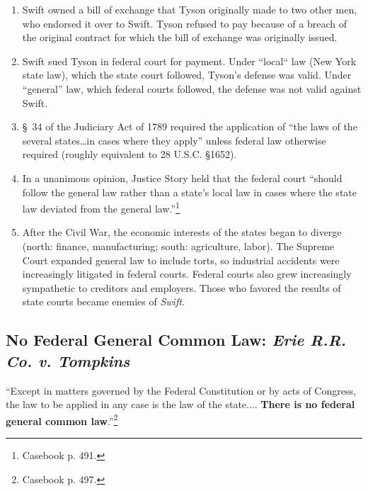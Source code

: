 \begin{enumerate}
    \item Swift owned a bill of exchange that Tyson originally made to two 
    other men, who endorsed it over to Swift. Tyson refused to pay because of 
    a breach of the original contract for which the bill of exchange was 
    originally issued.
    \item Swift sued Tyson in federal court for payment. Under 
    ``local`` law (New York state law), which the state court followed, 
    Tyson's defense was valid. Under ``general'' law, which federal courts 
    followed, the defense was not valid against Swift.
    \item \S\ 34 of the Judiciary Act of 1789 required the application of ``the 
    laws of the several states\ldots in cases where they apply'' unless 
    federal law otherwise required (roughly equivalent to 28 U.S.C. \S 1652).
    \item In a unanimous opinion, Justice Story held that the federal court 
    ``should follow the general law rather than a state's local law in cases 
    where the state law deviated from the general law.''\footnote{Casebook p. 
    491.}
    \item After the Civil War, the economic interests of the states began to 
    diverge (north: finance, manufacturing; south: agriculture, labor). The 
    Supreme Court expanded general law to include torts, so industrial 
    accidents were increasingly litigated in federal courts. Federal courts 
    also grew increasingly sympathetic to creditors and employers. Those who 
    favored the results of state courts became enemies of \emph{Swift}.
\end{enumerate}

\subsection{No Federal General Common Law: \emph{Erie R.R. Co. v. Tompkins}}

``Except in matters governed by the Federal Constitution or by acts of 
Congress, the law to be applied in any case is the law of the state....  
\textbf{There is no federal general common law}.''\footnote{Casebook p. 497.}

